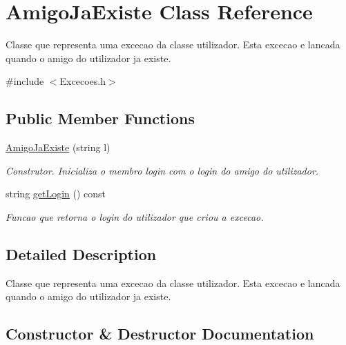 \hypertarget{class_amigo_ja_existe}{}\section{Amigo\+Ja\+Existe Class Reference}
\label{class_amigo_ja_existe}


Classe que representa uma excecao da classe utilizador. Esta excecao e lancada quando o amigo do utilizador ja existe.  




{\ttfamily \#include $<$Excecoes.\+h$>$}

\subsection*{Public Member Functions}
\begin{DoxyCompactItemize}
\item 
\hyperlink{class_amigo_ja_existe_a9d61f8dc97244fdd468b7d70b5f35409}{Amigo\+Ja\+Existe} (string l)
\begin{DoxyCompactList}\small\item\em Construtor. Inicializa o membro login com o login do amigo do utilizador. \end{DoxyCompactList}\item 
string \hyperlink{class_amigo_ja_existe_a12bf65d64c1be52121373270dbdf3fc4}{get\+Login} () const 
\begin{DoxyCompactList}\small\item\em Funcao que retorna o login do utilizador que criou a excecao. \end{DoxyCompactList}\end{DoxyCompactItemize}


\subsection{Detailed Description}
Classe que representa uma excecao da classe utilizador. Esta excecao e lancada quando o amigo do utilizador ja existe. 

\subsection{Constructor \& Destructor Documentation}
\hypertarget{class_amigo_ja_existe_a9d61f8dc97244fdd468b7d70b5f35409}{}
